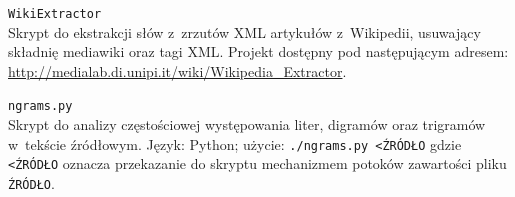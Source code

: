 \documentclass[12pt,a4paper,twoside]{article}
\newcounter{sccounter} %
\begin{document}
\begin{appendices}
\begin{myenumerate}
    \item {}\label{sc:wiki_extractor}
    \texttt{WikiExtractor} \\
    Skrypt do ekstrakcji słów z~zrzutów XML artykułów z~Wikipedii, usuwający
    składnię mediawiki oraz tagi XML. Projekt dostępny pod następującym
    \mbox{adresem}: \url{http://medialab.di.unipi.it/wiki/Wikipedia_Extractor}.

    \item {}\label{sc:ngrams_counter}
    \texttt{ngrams.py} \\
    Skrypt do analizy częstościowej występowania liter, digramów oraz trigramów
    w~tekście źródłowym. Język: Python; użycie: \texttt{./ngrams.py <ŹRÓDŁO}
    gdzie \texttt{<ŹRÓDŁO} oznacza przekazanie do skryptu mechanizmem potoków
    zawartości pliku \texttt{ŹRÓDŁO}.
    

\end{myenumerate}

\end{appendices}
\end{document}
